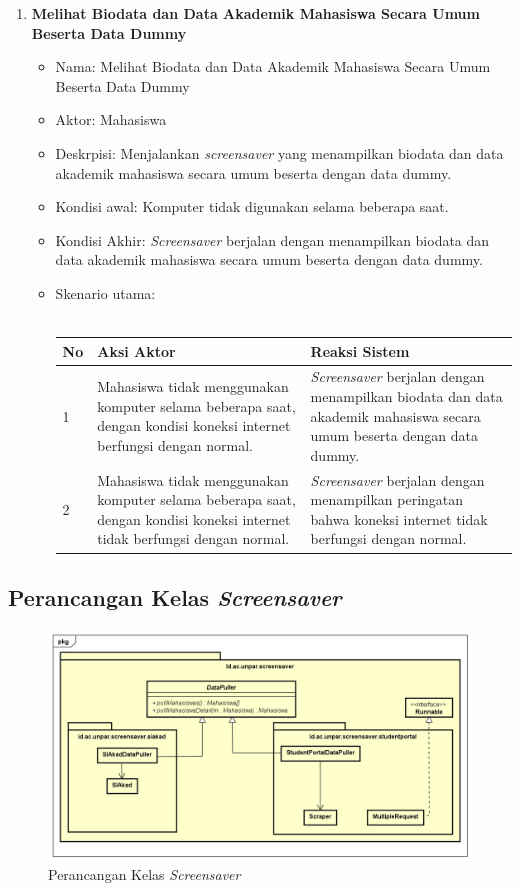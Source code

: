 \begin{enumerate}
	\item \textbf{Melihat Biodata dan Data Akademik Mahasiswa Secara Umum Beserta Data Dummy}
	\begin{itemize}
		\item Nama: Melihat Biodata dan Data Akademik Mahasiswa Secara Umum Beserta Data Dummy
		\item Aktor: Mahasiswa
		\item Deskrpisi: Menjalankan \textit{screensaver} yang menampilkan biodata dan data akademik mahasiswa secara umum beserta dengan data dummy.
		\item Kondisi awal: Komputer tidak digunakan selama beberapa saat.
		\item Kondisi Akhir: \textit{Screensaver} berjalan dengan menampilkan biodata dan data akademik mahasiswa secara umum beserta dengan data dummy.
		\item Skenario utama: \\ \\
			\begin{tabular}{|p{0.5cm} |p{6cm}| p{6cm}|}
				\hline
				No 	& Aksi Aktor & Reaksi Sistem \\ \hline
				1 	& Mahasiswa tidak menggunakan komputer selama beberapa saat, dengan kondisi  koneksi internet berfungsi dengan normal. 	&	\textit{Screensaver} berjalan dengan menampilkan biodata dan data akademik mahasiswa secara umum beserta dengan data dummy. \\ \hline 
				2 	& Mahasiswa tidak menggunakan komputer selama beberapa saat, dengan kondisi koneksi internet tidak berfungsi dengan normal. 	&	\textit{Screensaver} berjalan dengan menampilkan peringatan bahwa koneksi internet tidak berfungsi dengan normal. \\ \hline 
			\end{tabular}
	\end{itemize}
\end{enumerate}


\subsection{Perancangan Kelas \textit{Screensaver}}

\begin{figure}[H]
	\centering
	\includegraphics[scale=0.45]{Gambar/ClassDiagramAwal.png}
	\caption{Perancangan Kelas \textit{Screensaver}}
	\label{fig:3_diagram_kelas_awal}
\end{figure}


